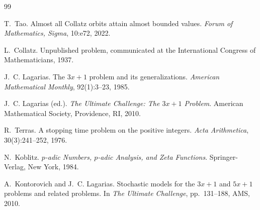 \documentclass[12pt,a4paper]{article}
\begin{document}
\begin{thebibliography}{99}

T.~Tao.
\newblock Almost all Collatz orbits attain almost bounded values.
\newblock \emph{Forum of Mathematics, Sigma}, 10:e72, 2022.

L.~Collatz.
\newblock Unpublished problem, communicated at the International Congress of Mathematicians, 1937.

J.~C. Lagarias.
\newblock The $3x+1$ problem and its generalizations.
\newblock \emph{American Mathematical Monthly}, 92(1):3--23, 1985.

J.~C. Lagarias (ed.).
\newblock \emph{The Ultimate Challenge: The $3x+1$ Problem}.
\newblock American Mathematical Society, Providence, RI, 2010.

R.~Terras.
\newblock A stopping time problem on the positive integers.
\newblock \emph{Acta Arithmetica}, 30(3):241--252, 1976.

N.~Koblitz.
\newblock \emph{$p$-adic Numbers, $p$-adic Analysis, and Zeta Functions}.
\newblock Springer-Verlag, New York, 1984.

A.~Kontorovich and J.~C. Lagarias.
\newblock Stochastic models for the $3x+1$ and $5x+1$ problems and related problems.
\newblock In \emph{The Ultimate Challenge}, pp.\ 131--188, AMS, 2010.

\end{thebibliography}
\end{document}
